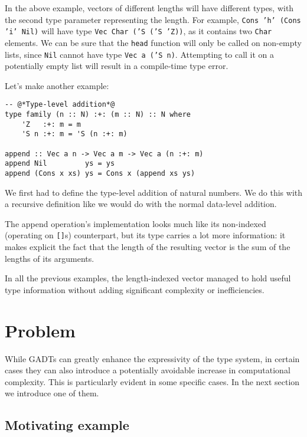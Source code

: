 In the above example, vectors of different lengths will have different types, with the second type parameter representing the length.
For example, \texttt{Cons 'h' (Cons 'i' Nil)} will have type \texttt{Vec Char ('S ('S 'Z))}, as it contains two \texttt{Char} elements.
We can be sure that the \texttt{head} function will only be called on non-empty lists, since \texttt{Nil} cannot have type \texttt{Vec a ('S n)}.
Attempting to call it on a potentially empty list will result in a compile-time type error.

Let's make another example:

\begin{lstlisting}[caption=Appending a \texttt{Vec} to another]
-- @*Type-level addition*@
type family (n :: N) :+: (m :: N) :: N where
    'Z   :+: m = m
    'S n :+: m = 'S (n :+: m)

append :: Vec a n -> Vec a m -> Vec a (n :+: m)
append Nil         ys = ys
append (Cons x xs) ys = Cons x (append xs ys)
\end{lstlisting}

We first had to define the type-level addition of natural numbers. We do this with a recursive definition like we would do with the normal data-level addition.

The append operation's implementation looks much like its non-indexed (operating on \texttt{[]}s) counterpart, but its type carries a lot more information: it makes explicit the fact that the length of the resulting vector is the sum of the lengths of its arguments.

In all the previous examples, the length-indexed vector managed to hold useful type information without adding significant complexity or inefficiencies.

\section{Problem}
\label{sec:problem}

While GADTs can greatly enhance the expressivity of the type system, in certain cases they can also introduce a potentially avoidable increase in computational complexity.
This is particularly evident in some specific cases.
In the next section we introduce one of them.

\subsection{Motivating example}
\label{subsec:motivating-example}

